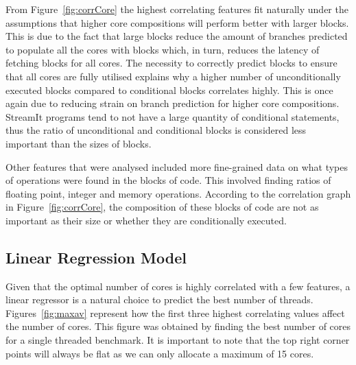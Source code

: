 From Figure~\ref{fig:corrCore} the highest correlating features fit naturally under the assumptions that higher core compositions will perform better with larger blocks.
This is due to the fact that large blocks reduce the amount of branches predicted to populate all the cores with blocks which, in turn, reduces the latency of fetching blocks for all cores.
The necessity to correctly predict blocks to ensure that all cores are fully utilised explains why a higher number of unconditionally executed blocks compared to conditional blocks correlates highly.
This is once again due to reducing strain on branch prediction for higher core compositions.
StreamIt programs tend to not have a large quantity of conditional statements, thus the ratio of unconditional and conditional blocks is considered less important than the sizes of blocks.

Other features that were analysed included more fine-grained data on what types of operations were found in the blocks of code.
This involved finding ratios of floating point, integer and memory operations.
According to the correlation graph in Figure~\ref{fig:corrCore}, the composition of these blocks of code are not as important as their size or whether they are conditionally executed.


\subsection{Linear Regression Model}
Given that the optimal number of cores is highly correlated with a few features, a linear regressor is a natural choice to predict the best number of threads.
Figures~\ref{fig:maxav} represent how the first three highest correlating values affect the number of cores.
This figure was obtained by finding the best number of cores for a single threaded benchmark.
It is important to note that the top right corner points will always be flat as we can only allocate a maximum of 15 cores.

